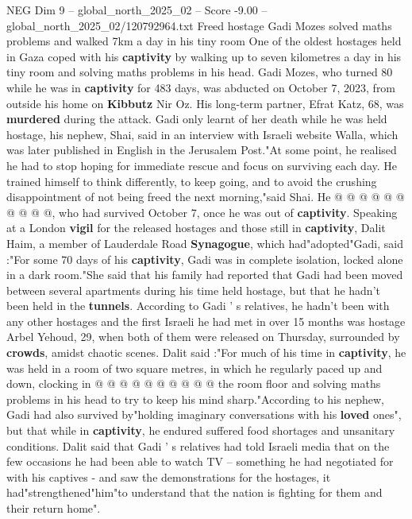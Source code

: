 \begin{textsample}{NEG Dim 9 – global\_north\_2025\_02 – Score -9.00 – global\_north\_2025\_02/120792964.txt}  \label{ex:f9_neg_057}
Freed hostage Gadi Mozes solved maths problems and walked 7km a day in his tiny room One of the oldest hostages held in Gaza coped with his \textbf{captivity} by walking up to seven kilometres a day in his tiny room and solving maths problems in his head.
Gadi Mozes, who turned 80 while he was in \textbf{captivity} for 483 days, was abducted on October 7, 2023, from outside his home on \textbf{Kibbutz} Nir Oz.
His long-term partner, Efrat Katz, 68, was \textbf{murdered} during the attack.
Gadi only learnt of her death while he was held hostage, his nephew, Shai, said in an interview with Israeli website Walla, which was later published in English in the Jerusalem Post."At some point, he realised he had to stop hoping for immediate rescue and focus on surviving each day.
He trained himself to think differently, to keep going, and to avoid the crushing disappointment of not being freed the next morning,"said Shai.
He @ @ @ @ @ @ @ @ @ @, who had survived October 7, once he was out of \textbf{captivity}.
Speaking at a London \textbf{vigil} for the released hostages and those still in \textbf{captivity}, Dalit Haim, a member of Lauderdale Road \textbf{Synagogue}, which had"adopted"Gadi, said :"For some 70 days of his \textbf{captivity}, Gadi was in complete isolation, locked alone in a dark room."She said that his family had reported that Gadi had been moved between several apartments during his time held hostage, but that he hadn't been held in the \textbf{tunnels}.
According to Gadi ' s relatives, he hadn't been with any other hostages and the first Israeli he had met in over 15 months was hostage Arbel Yehoud, 29, when both of them were released on Thursday, surrounded by \textbf{crowds}, amidst chaotic scenes.
Dalit said :"For much of his time in \textbf{captivity}, he was held in a room of two square metres, in which he regularly paced up and down, clocking in @ @ @ @ @ @ @ @ @ @ the room floor and solving maths problems in his head to try to keep his mind sharp."According to his nephew, Gadi had also survived by"holding imaginary conversations with his \textbf{loved} ones", but that while in \textbf{captivity}, he endured suffered food shortages and unsanitary conditions.
Dalit said that Gadi ' s relatives had told Israeli media that on the few occasions he had been able to watch TV -- something he had negotiated for with his captives - and saw the demonstrations for the hostages, it had"strengthened"him"to understand that the nation is fighting for them and their return home".

\end{textsample}
